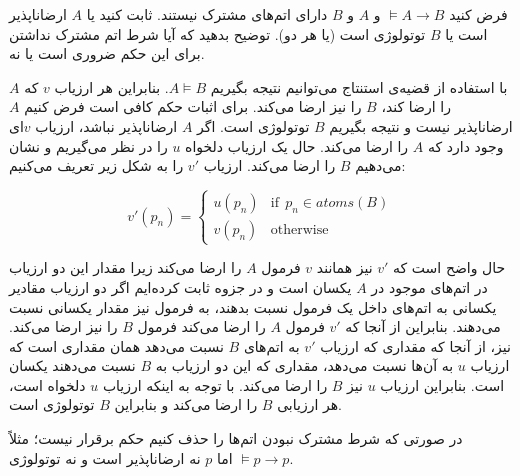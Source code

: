 فرض کنید $\models A\rightarrow B$ و $A$ و $B$ دارای اتم‌های مشترک نیستند. ثابت کنید یا $A$ ارضاناپذیر است یا $B$ توتولوژی است (یا هر دو). توضیح بدهید که آیا شرط اتم مشترک نداشتن برای این حکم ضروری است یا نه.
\begin{ans}
  با استفاده از قضیه‌ی استنتاج می‌توانیم نتیجه بگیریم $A\models B$. بنابراین هر ارزیاب $v$ که $A$ را ارضا کند، $B$ را نیز ارضا می‌کند. برای اثبات حکم کافی است فرض کنیم $A$ ارضاناپذیر نیست و نتیجه بگیریم $B$ توتولوژی است. اگر $A$ ارضاناپذیر نباشد، ارزیاب $v$ای وجود دارد که $A$ را ارضا می‌کند. حال یک ارزیاب دلخواه $u$ را در نظر می‌گیریم و نشان می‌دهیم $B$ را ارضا می‌کند. ارزیاب $v'$ را به شکل زیر تعریف می‌کنیم:

  $$
  v'(p_n)=
  \begin{cases}
  u(p_n) & \text{if}~~p_n\in atoms(B) \\
  v(p_n) & \text{otherwise}
  \end{cases}
  $$

  حال واضح است که $v'$ نیز همانند $v$ فرمول $A$ را ارضا می‌کند زیرا مقدار این دو ارزیاب در اتم‌های موجود در $A$ یکسان است و در جزوه ثابت کرده‌ایم اگر دو ارزیاب مقادیر یکسانی به اتم‌های داخل یک فرمول نسبت بدهند، به فرمول نیز مقدار یکسانی نسبت می‌دهند. بنابراین از آنجا که $v'$ فرمول $A$ را ارضا می‌کند فرمول $B$ را نیز ارضا می‌کند. نیز، از آنجا که مقداری که ارزیاب $v'$ به اتم‌های $B$ نسبت می‌دهد همان مقداری است که ارزیاب $u$ به آن‌ها نسبت می‌دهد، مقداری که این دو ارزیاب به $B$ نسبت می‌دهند یکسان است. بنابراین ارزیاب $u$ نیز $B$ را ارضا می‌کند. با توجه به اینکه ارزیاب $u$ دلخواه است، هر ارزیابی $B$ را ارضا می‌کند و بنابراین $B$ توتولوژی است.

  در صورتی که شرط مشترک نبودن اتم‌ها را حذف کنیم حکم برقرار نیست؛ مثلاً
  $\models p\rightarrow p$
  اما $p$ نه ارضاناپذیر است و نه توتولوژی.
\end{ans}
